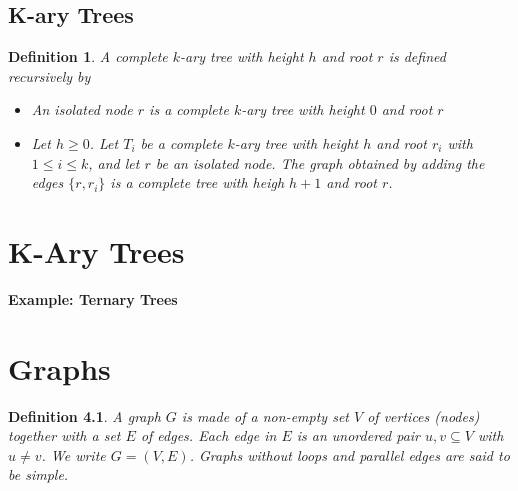 \documentclass[openany]{report}
\newtheorem{definition}{Definition}[section]
\begin{document}
\section{K-ary Trees}
\begin{definition}
    A complete $k$-ary tree with height $h$ and root $r$ is defined recursively by 
    \begin{itemize}
        \item An isolated node $r$ is a complete $k$-ary tree with height $0$ and root $r$
        \item Let $h \geq 0$. Let $T_i$ be a complete $k$-ary tree with height $h$ and root $r_i$ with $1 \leq i \leq k$, and let $r$ be an isolated node. The graph obtained by adding the edges $\{r,r_i\}$ is a complete tree with heigh $h+1$ and root $r$.
    \end{itemize}
\end{definition}


\chapter{K-Ary Trees}
\textbf{Example: Ternary Trees}

\chapter{}

\chapter{Graphs}
\begin{definition}
    A \emph{graph} $G$ is made of a non-empty set $V$ of \emph{vertices} (nodes)
    together with a set $E$ of \emph{edges}. Each edge in $E$ is an unordered pair ${u, v} \subseteq V$ with $u \neq v$. We write $G = (V,E)$. Graphs without loops and parallel edges are said to be \emph{simple}. 
\end{definition}
\end{document}
